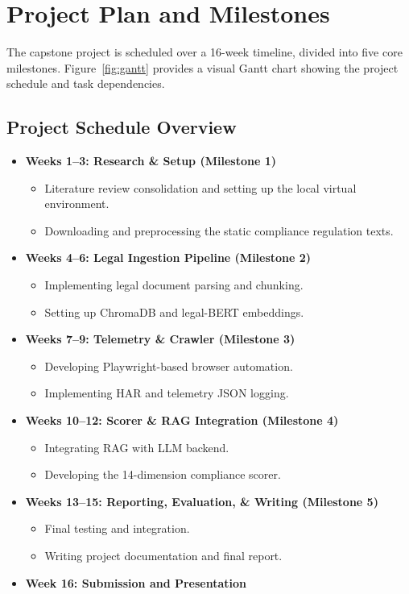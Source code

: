 \documentclass[11pt,a4paper]{article}
\begin{document}
\section{Project Plan and Milestones}
The capstone project is scheduled over a 16-week timeline, divided into five core milestones. Figure~\ref{fig:gantt} provides a visual Gantt chart showing the project schedule and task dependencies.

\subsection{Project Schedule Overview}
\begin{itemize}
    \item \textbf{Weeks 1--3: Research \& Setup (Milestone 1)}
    \begin{itemize}
        \item Literature review consolidation and setting up the local virtual environment.
        \item Downloading and preprocessing the static compliance regulation texts.
    \end{itemize}
    \item \textbf{Weeks 4--6: Legal Ingestion Pipeline (Milestone 2)}
    \begin{itemize}
        \item Implementing legal document parsing and chunking.
        \item Setting up ChromaDB and legal-BERT embeddings.
    \end{itemize}
    \item \textbf{Weeks 7--9: Telemetry \& Crawler (Milestone 3)}
    \begin{itemize}
        \item Developing Playwright-based browser automation.
        \item Implementing HAR and telemetry JSON logging.
    \end{itemize}
    \item \textbf{Weeks 10--12: Scorer \& RAG Integration (Milestone 4)}
    \begin{itemize}
        \item Integrating RAG with LLM backend.
        \item Developing the 14-dimension compliance scorer.
    \end{itemize}
    \item \textbf{Weeks 13--15: Reporting, Evaluation, \& Writing (Milestone 5)}
    \begin{itemize}
        \item Final testing and integration.
        \item Writing project documentation and final report.
    \end{itemize}
    \item \textbf{Week 16: Submission and Presentation}
\end{itemize}
\end{document}
